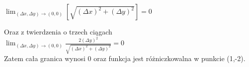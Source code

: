 \documentclass[12pt]{article}
\begin{document}
\begin{itemize}
        $ \lim_{(\Delta x, \Delta y) \rightarrow (0,0)} \left[ \sqrt{(\Delta x)^2 + (\Delta y)^2} \right] = 0$\newline
        
        Oraz z twierdzenia o trzech ciągach\newline
        \\
        $\lim_{(\Delta x, \Delta y) \rightarrow (0,0)} \frac{2(\Delta y)^2}{\sqrt{(\Delta x)^2 + (\Delta y)^2}} = 0 $\newline
        \\
        Zatem cała granica wynosi 0 oraz funkcja jest różniczkowalna w punkcie (1,-2).
        
        
        
    \end{itemize}
   
    \newpage
\end{document}
